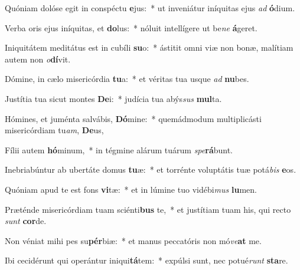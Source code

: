 \item Quóniam dolóse egit in conspéctu \textbf{e}jus:~* ut inveniátur iníquitas ejus \textit{ad} \textbf{ó}dium.
\item Verba oris ejus iníquitas, et \textbf{do}lus:~* nóluit intellígere ut be\textit{ne} \textbf{á}geret.
\item Iniquitátem meditátus est in cubíli \textbf{su}o:~* ástitit omni viæ non bonæ, malítiam autem non \textit{o}\textbf{dí}vit.
\item Dómine, in cælo misericórdia \textbf{tu}a:~* et véritas tua usque \textit{ad} \textbf{nu}bes.
\item Justítia tua sicut montes \textbf{De}i:~* judícia tua abýs\textit{sus} \textbf{mul}ta.
\item Hómines, et juménta salvábis, \textbf{Dó}mine:~* quemádmodum multiplicásti misericórdiam tu\textit{am}, \textbf{De}us,
\item Fílii autem \textbf{hó}minum,~* in tégmine alárum tuárum \textit{spe}\textbf{rá}bunt.
\item Inebriabúntur ab ubertáte domus \textbf{tu}æ:~* et torrénte voluptátis tuæ potá\textit{bis} \textbf{e}os.
\item Quóniam apud te est fons \textbf{vi}tæ:~* et in lúmine tuo vidébi\textit{mus} \textbf{lu}men.
\item Præténde misericórdiam tuam sciénti\textbf{bus} te,~* et justítiam tuam his, qui recto \textit{sunt} \textbf{cor}de.
\item Non véniat mihi pes su\textbf{pér}biæ:~* et manus peccatóris non mó\textit{ve}\textbf{at} me.
\item Ibi cecidérunt qui operántur iniqui\textbf{tá}tem:~* expúlsi sunt, nec potué\textit{runt} \textbf{sta}re.
